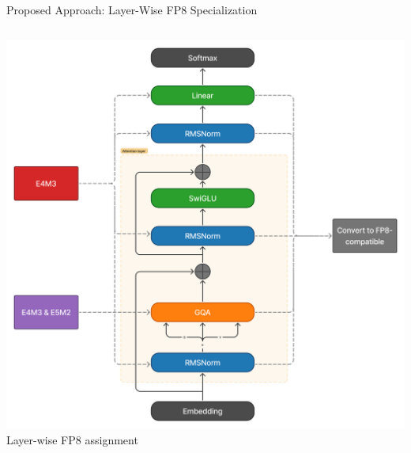 \begin{frame}[squeeze]{Proposed Approach: Layer-Wise FP8 Specialization}
\begin{columns}[c]
\begin{column}{0.40\textwidth}
    \centering
    \includegraphics[width=\textwidth]{figures/fp8_convert.png}
    \tiny Layer-wise FP8 assignment
\end{column}
\end{columns}

\end{frame}
